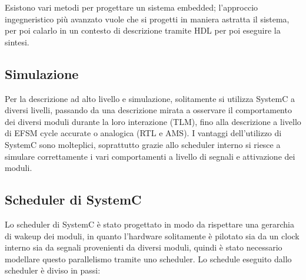 \documentclass[11pt]{article} %
\begin{document}
Esistono vari metodi per progettare un sistema embedded; l'approccio ingegneristico più avanzato vuole che si progetti in maniera astratta il sistema, per poi calarlo in un contesto di descrizione tramite HDL per poi eseguire la sintesi. 

\subsection{Simulazione}

Per la descrizione ad alto livello e simulazione, solitamente si utilizza SystemC a diversi livelli, passando da una descrizione mirata a osservare il comportamento dei diversi moduli durante la loro interazione (TLM), fino alla descrizione a livello di EFSM cycle accurate o analogica (RTL e AMS). I vantaggi dell'utilizzo di SystemC sono molteplici, soprattutto grazie allo scheduler interno si riesce a simulare correttamente i vari comportamenti a livello di segnali e attivazione dei moduli.

\subsection{Scheduler di SystemC}

Lo scheduler di SystemC è stato progettato in modo da rispettare una gerarchia di wakeup dei moduli, in quanto l'hardware solitamente è pilotato sia da un clock interno sia da segnali provenienti da diversi moduli, quindi è stato necessario modellare questo parallelismo tramite uno scheduler. Lo schedule eseguito dallo scheduler è diviso in passi:
\end{document}
